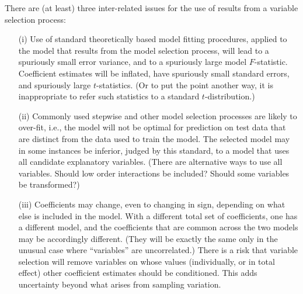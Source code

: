 There are (at least) three inter-related issues for the use of results
from a variable selection process:
\begin{enumerate}
\item[(i)] Use of standard theoretically based model fitting procedures,
  applied to the model that results from the model selection process,
  will lead to a spuriously small error variance, and to a spuriously
  large model $F$-statistic.  Coefficient estimates will be inflated,
  have spuriously small standard errors, and spuriously large
  $t$-statistics.  (Or to put the point another way, it is inappropriate
  to refer such statistics to a standard $t$-distribution.)
\item[(ii)] Commonly used stepwise and other model selection processes
  are likely to over-fit, i.e., the model will not be optimal for
  prediction on test data that are distinct from the data used to
  train the model.  The selected model may in some instances be
  inferior, judged by this standard, to a model that uses all candidate
  explanatory variables. (There are alternative ways to use all variables.
  Should low order interactions be included?  Should some variables be
  transformed?)
\item[(iii)] Coefficients may change, even to changing in sign, depending
  on what else is included in the model. With a different total set of
  coefficients, one has a different model, and the coefficients that
  are common across the two models may be accordingly different.
  (They will be exactly the same only in the unusual case where
  ``variables'' are uncorrelated.)  There is a risk that variable
  selection will remove variables on whose values (individually, or in
  total effect) other coefficient estimates should be conditioned.
  This adds uncertainty beyond what arises from sampling variation.
  \label{item:coef}
\end{enumerate}

